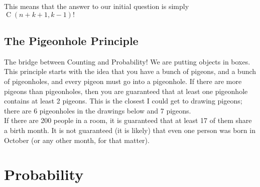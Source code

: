 \documentclass{report}
\DeclareMathOperator{\comb}{C}
\begin{document}
This means that the answer to our initial question is simply
$\comb(n + k + 1, k - 1)!$

\section{The Pigeonhole Principle}

The bridge between Counting and Probability!
We are putting objects in boxes. \\

This principle starts with the idea that you have a bunch of pigeons, and a bunch of pigeonholes, and every pigeon must go into a pigeonhole. If there are more pigeons than pigeonholes, then you are guaranteed  that at least one pigeonhole contains at least 2 pigeons. This is the closest I could get to drawing pigeons; there are 6 pigeonholes in the drawings below and 7 pigeons. \\

If there are 200 people in a room, it is guaranteed that at least 17 of them share a birth month. It is not guaranteed (it is likely) that even one person was born in October (or any other month, for that matter). 



\chapter{Probability}
\end{document}
